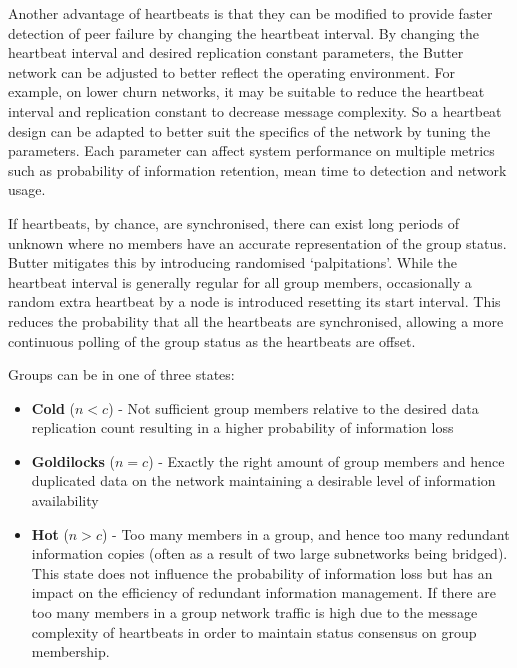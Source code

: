 Another advantage of heartbeats is that they can be modified to provide faster detection of peer failure by changing the heartbeat interval. By changing the heartbeat interval and desired replication constant parameters, the Butter network can be adjusted to better reflect the operating environment. For example, on lower churn networks, it may be suitable to reduce the heartbeat interval and replication constant to decrease message complexity. So a heartbeat design can be adapted to better suit the specifics of the network by tuning the parameters. Each parameter can affect system performance on multiple metrics such as probability of information retention, mean time to detection and network usage.

If heartbeats, by chance, are synchronised, there can exist long periods of unknown where no members have an accurate representation of the group status. Butter mitigates this by introducing randomised `palpitations'. While the heartbeat interval is generally regular for all group members, occasionally a random extra heartbeat by a node is introduced resetting its start interval. This reduces the probability that all the heartbeats are synchronised, allowing a more continuous polling of the group status as the heartbeats are offset.


\noindent Groups can be in one of three states:
\begin{itemize}
    \item \textbf{Cold} ($n<c$) - Not sufficient group members relative to the desired data replication count resulting in a higher probability of information loss
    \item \textbf{Goldilocks} ($n=c$) - Exactly the right amount of group members and hence duplicated data on the network maintaining a desirable level of information availability
    \item \textbf{Hot} ($n>c$) - Too many members in a group, and hence too many redundant information copies (often as a result of two large subnetworks being bridged). This state does not influence the probability of information loss but has an impact on the efficiency of redundant information management. If there are too many members in a group network traffic is high due to the message complexity of heartbeats in order to maintain status consensus on group membership.
\end{itemize}

